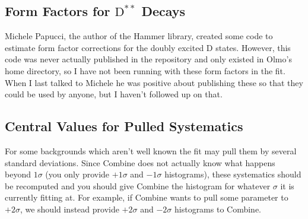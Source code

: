 \documentclass[12pt]{report}
\begin{document}
\subsection{Form Factors for $\mathrm{D}^{**}$ Decays}
Michele Papucci, the author of the Hammer library, created some code to
estimate form factor corrections for the doubly excited D states. However, this
code was never actually published in the repository and only existed in Olmo's
home directory, so I have not been running with these form factors in the fit.
When I last talked to Michele he was positive about publishing these so that
they could be used by anyone, but I haven't followed up on that.
\subsection{Central Values for Pulled Systematics}
For some backgrounds which aren't well known the fit may pull them by several
standard deviations. Since Combine does not actually know what happens beyond
$1\sigma$ (you only provide $+1\sigma$ and $-1\sigma$ histograms), these
systematics should be recomputed and you should give Combine the histogram for
whatever $\sigma$ it is currently fitting at. For example, if Combine wants to
pull some parameter to $+2\sigma$, we should instead provide $+2\sigma$ and
$-2\sigma$ histograms to Combine.
\end{document}
